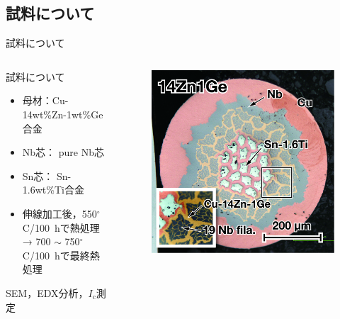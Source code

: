 \documentclass[aspectratio=169, unicode, 10pt]{beamer}
\begin{document}
	\subsection{試料について}
	\begin{frame}{試料について}
		\begin{columns}
			\begin{column}{0.6\linewidth}
				\begin{block}{試料について}
					\begin{itemize}
							\item 母材：Cu-14wt\%Zn-1wt\%Ge合金
							\item Nb芯： pure Nb芯
							\item Sn芯： Sn-1.6wt\%Ti合金
							\item 伸線加工後，550$^\circ$C/100~hで熱処理 → 700 $\sim$ 750$^\circ$C/100~hで最終熱処理
					\end{itemize}
				\end{block}
				SEM，EDX分析，$I_\mathrm{c}$測定
			\end{column}
			\begin{column}{0.4\linewidth}
				\begin{figure}
					\centering
					\includegraphics[width=\linewidth]{figs/14Zn1Ge_crossSection.jpg}
				\end{figure}
			\end{column}
		\end{columns}
	\end{frame}
\end{document}

